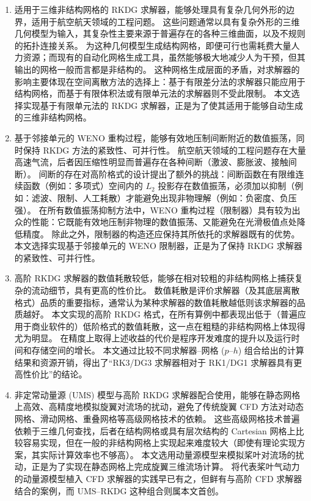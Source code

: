 \begin{enumerate}[wide]
\item 适用于三维非结构网格的 RKDG 求解器，能够处理具有复杂几何外形的边界，适用于航空航天领域的工程问题。
这些问题通常以具有复杂外形的三维几何模型为输入，其复杂性主要来源于普遍存在的各种三维曲面，以及不规则的拓扑连接关系。
为这种几何模型生成结构网格，即便可行也需耗费大量人力资源；而现有的自动化网格生成工具，虽然能够极大地减少人为干预，但其输出的网格一般而言都是非结构的。
这种网格生成层面的矛盾，对求解器的影响主要体现在空间离散方法的选择上：基于有限差分法的求解器只能应用于结构网格，而基于有限体积法或有限单元法的求解器则不受此限制。
本文选择实现基于有限单元法的 RKDG 求解器，正是为了使其适用于能够自动生成的三维非结构网格。

\item 基于邻接单元的 WENO 重构过程，能够有效地压制间断附近的数值振荡，同时保持 RKDG 方法的紧致性、可并行性。
航空航天领域的工程问题存在大量高速气流，后者因压缩性明显而普遍存在各种间断（激波、膨胀波、接触间断）。
间断的存在对高阶格式的设计提出了额外的挑战：间断函数在有限维连续函数（例如：多项式）空间内的 $L_2$ 投影存在数值振荡，必须加以抑制（例如：滤波、限制、人工耗散）才能避免出现非物理解（例如：负密度、负压强）。
在所有数值振荡抑制方法中，WENO 重构过程（限制器）具有较为出众的性能：它既能有效地压制非物理的数值振荡、又能避免在光滑极值点处降低精度。
除此之外，限制器的构造还应保持其所依托的求解器既有的优势。本文选择实现基于邻接单元的 WENO 限制器，正是为了保持 RKDG 求解器的紧致性、可并行性。

\item 高阶 RKDG 求解器的数值耗散较低，能够在相对较粗的非结构网格上捕获复杂的流动细节，具有更高的性价比。
数值耗散是评价求解器（及其底层离散格式）品质的重要指标，通常认为某种求解器的数值耗散越低则该求解器的品质越好。
本文实现的高阶 RKDG 格式，在所有算例中都表现出低于（普遍应用于商业软件的）低阶格式的数值耗散，这一点在粗糙的非结构网格上体现得尤为明显。
在精度上取得上述收益的代价是程序开发难度的提升以及运行时间和存储空间的增长。
本文通过比较不同求解器–网格 ($p$–$h$) 组合给出的计算结果和资源开销，得出了“RK3/DG3 求解器相对于 RK1/DG1 求解器具有更高性价比”的结论。

\item 非定常动量源 (UMS) 模型与高阶 RKDG 求解器配合使用，能够在静态网格上高效、高精度地模拟旋翼对流场的扰动，避免了传统旋翼 CFD 方法对动态网格、滑动网格、重叠网格等高级网格技术的依赖。
这些高级网格技术普遍依赖于三维几何查找，后者在结构网格或具有层次结构的 Cartesian 网格上比较容易实现，但在一般的非结构网格上实现起来难度较大（即使有理论实现方案，其实际计算效率也不够高）。
本文选用动量源模型来模拟桨叶对流场的扰动，正是为了实现在静态网格上完成旋翼三维流场计算。
将代表桨叶气动力的动量源模型植入 CFD 求解器的实践早已有之，但鲜有与高阶 CFD 求解器结合的案例，而 UMS–RKDG 这种组合则属本文首创。


\end{enumerate}

